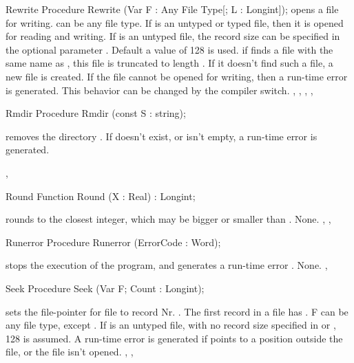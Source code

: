 \documentclass{report}
\begin{document}

\begin{procedure}{Rewrite}
\Declaration
Procedure Rewrite (Var F : Any File Type[; L : Longint]);
\Description
{} opens a file  for writing.  can be any file type.
If  is an untyped or typed file, then it is opened for reading and
writing. If  is an untyped file, the record size can be specified in
the optional parameter . Default a value of 128 is used.
if  finds a file with the same name as , this file is
truncated to length . If it doesn't find such a file, a new file is
created.
\Errors
If the file cannot be opened for writing, then a run-time error is
generated. This behavior can be changed by the  compiler switch.
\SeeAlso
{}, , , , 
\end{procedure}


\begin{procedure}{Rmdir}
\Declaration
Procedure Rmdir (const S : string);

\Description
{} removes the directory .
\Errors
If  doesn't exist, or isn't empty, a run-time error is generated.

\SeeAlso
{}, 
\end{procedure}


\begin{function}{Round}
\Declaration
Function Round (X : Real) : Longint;

\Description
{} rounds  to the closest integer, which may be bigger or
smaller than .
\Errors
None.
\SeeAlso
{}, , 
\end{function}


\begin{procedure}{Runerror}
\Declaration
Procedure Runerror (ErrorCode : Word);

\Description
{} stops the execution of the program, and generates a
run-time error .
\Errors
None.
\SeeAlso
{}, 
\end{procedure}


\begin{procedure}{Seek}
\Declaration
Procedure Seek (Var F; Count : Longint);

\Description
{} sets the file-pointer for file  to record Nr. .
The first record in a file has . F can be any file type, except
. If  is an untyped file, with no record size specified in
 or , 128 is assumed.
\Errors
A run-time error is generated if  points to a position outside
the file, or the file isn't opened.
\SeeAlso
{}, , 
\end{procedure}
\end{document}
